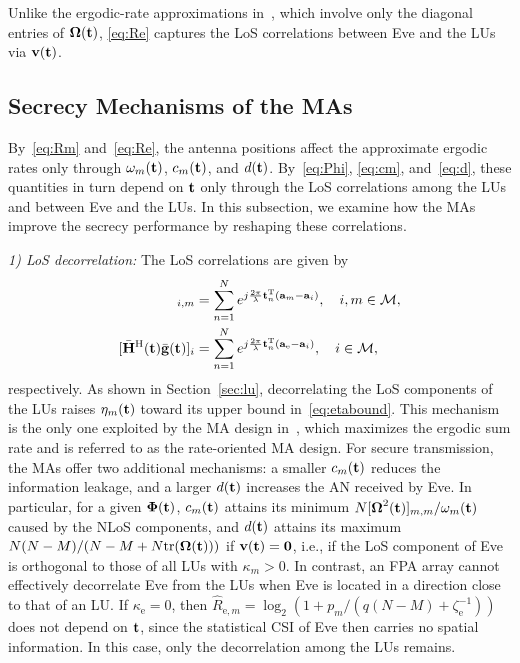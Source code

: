 \documentclass[journal]{IEEEtran}
\begin{document}
Unlike the ergodic-rate approximations in~\cite{ZhangJSTSP2014,ZhengTCOM2025}, which involve only the diagonal entries of $\boldsymbol{\Omega}(\mathbf{t})$, \eqref{eq:Re} captures the LoS correlations between Eve and the LUs via $\mathbf{v}(\mathbf{t})$.

\subsection{Secrecy Mechanisms of the MAs}\label{sec:insight}

By~\eqref{eq:Rm} and~\eqref{eq:Re}, the antenna positions affect the approximate ergodic rates only through $\omega_m(\mathbf{t})$, $c_m(\mathbf{t})$, and $d(\mathbf{t})$. By~\eqref{eq:Phi}, \eqref{eq:cm}, and~\eqref{eq:d}, these quantities in turn depend on $\mathbf{t}$ only through the LoS correlations among the LUs and between Eve and the LUs. In this subsection, we examine how the MAs improve the secrecy performance by reshaping these correlations.

\textit{1) LoS decorrelation:} The LoS correlations are given by
\begin{align}
[\Hb^{\mathrm H}(\bt)\Hb(\bt)]_{i,m}&=\sum_{n=1}^{N}e^{j\frac{2\pi}{\lambda}\bt_n^{\mathrm T}(\ba_{m}-\ba_i)},\quad i,m\in\mathcal M,\label{eq:corrLU}\\
[\Hb^{\mathrm H}(\bt)\gb(\bt)]_{i}&=\sum_{n=1}^{N}e^{j\frac{2\pi}{\lambda}\bt_n^{\mathrm T}(\ba_{\mathrm e}-\ba_i)},\quad i\in\mathcal M,\label{eq:corrEve}
\end{align}
respectively. As shown in Section~\ref{sec:lu}, decorrelating the LoS components of the LUs raises $\eta_m(\mathbf{t})$ toward its upper bound in~\eqref{eq:etabound}. This mechanism is the only one exploited by the MA design in~\cite{ZhengTCOM2025}, which maximizes the ergodic sum rate and is referred to as the rate-oriented MA design. For secure transmission, the MAs offer two additional mechanisms: a smaller $c_m(\mathbf{t})$ reduces the information leakage, and a larger $d(\mathbf{t})$ increases the AN received by Eve. In particular, for a given $\boldsymbol{\Phi}(\mathbf{t})$, $c_m(\mathbf{t})$ attains its minimum $N[\boldsymbol{\Omega}^2(\mathbf{t})]_{m,m}/\omega_m(\mathbf{t})$ caused by the NLoS components, and $d(\mathbf{t})$ attains its maximum $N(N-M)/(N-M+N\mathrm{tr}(\boldsymbol{\Omega}(\mathbf{t})))$ if $\mathbf{v}(\mathbf{t})=\mathbf 0$, i.e., if the LoS component of Eve is orthogonal to those of all LUs with $\kappa_m>0$. In contrast, an FPA array cannot effectively decorrelate Eve from the LUs when Eve is located in a direction close to that of an LU. If $\kappa_{\mathrm e}=0$, then $\hat R_{\mathrm{e},m}=\log_2(1+p_m/(q(N-M)+\zeta_{\mathrm e}^{-1}))$ does not depend on $\mathbf{t}$, since the statistical CSI of Eve then carries no spatial information. In this case, only the decorrelation among the LUs remains.
\end{document}
